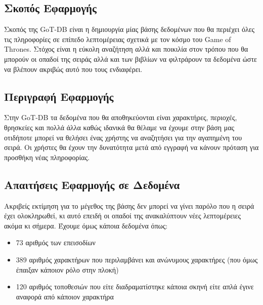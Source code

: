 \documentclass[../main.tex]{subfiles}
\begin{document}
\subsection{Σκοπός Εφαρμογής}
Σκοπός της GoT-DB είναι η δημιουργία μίας βάσης δεδομένων που θα περιέχει όλες
τις πληροφορίες σε επίπεδο λεπτομέρειας σχετικά με τον κόσμο του Game of
Thrones. Στόχος είναι η εύκολη αναζήτηση αλλά και ποικιλία στον τρόπου που θα
μπορούν οι οπαδοί της σειράς αλλά και των βιβλίων να φιλτράρουν τα δεδομένα
ώστε να βλέπουν ακριβώς αυτό που τους ενδιαφέρει.

\subsection{Περιγραφή Εφαρμογής}
Στην GoT-DB τα δεδομένα που θα αποθηκεύονται είναι χαρακτήρες, περιοχές,
θρησκείες και πολλά άλλα καθώς ιδανικά θα θέλαμε να έχουμε στην βάση μας
οτιδήποτε μπορεί να θελήσει ένας χρήστης να αναζητήσει για την αγαπημένη του
σειρά. Οι χρήστες θα έχουν την δυνατότητα μετά από εγγραφή να κάνουν πρόταση
για προσθήκη νέας πληροφορίας.

\subsection{Απαιτήσεις Εφαρμογής σε Δεδομένα}

Ακριβείς εκτίμηση για το μέγεθος της βάσης δεν μπορεί να γίνει παρόλο που η
σειρά έχει ολοκληρωθεί, κι αυτό επειδή οι οπαδοί της ανακαλύπτουν νέες
λεπτομέρειες ακόμα κι σήμερα. Έχουμε όμως κάποια δεδομένα όπως: 

\begin{itemize}
  \item 73 αριθμός των επεισοδίων  
  \item 389 αριθμός χαρακτήρων που περιλαμβάνει και ανώνυμους χαρακτήρες (που
    όμως έπαιξαν κάποιον ρόλο στην πλοκή)
  \item 120 αριθμός τοποθεσιών που είτε διαδραματίστηκε κάποια σκηνή είτε απλά
    έγινε αναφορά από κάποιον χαρακτήρα
\end{itemize}
\end{document}

